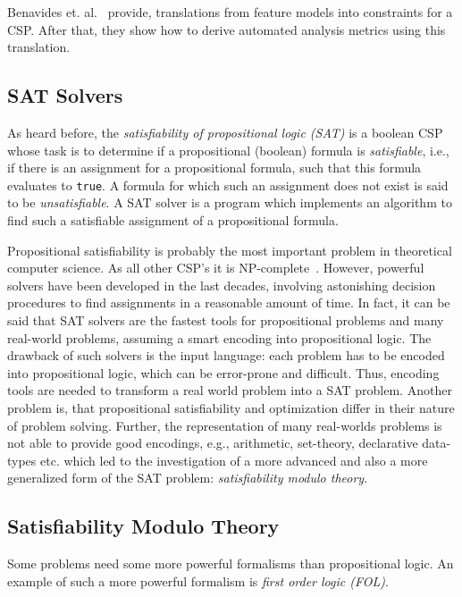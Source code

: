 Benavides et. al.~\cite{auto-reason-fm} provide, translations from feature models into constraints for a CSP. After that, they show how to derive automated analysis metrics using this translation.

\subsection{SAT Solvers}\label{subsec:sat}
As heard before, the \emph{satisfiability of propositional logic (SAT)} is a boolean CSP whose task is to determine if a propositional (boolean) formula is \emph{satisfiable}, i.e., if there is an assignment for a propositional formula, such that this formula evaluates to \verb|true|. A formula for which such an assignment does not exist is said to be \emph{unsatisfiable}. A SAT solver is a program which implements an algorithm to find such a satisfiable assignment of a propositional formula.

Propositional satisfiability is probably the most important problem in theoretical computer science. As all other CSP's it is NP-complete~\cite{cook}. 
However, powerful solvers have been developed in the last decades, involving astonishing decision procedures to find assignments in a reasonable amount of time. 
In fact, it can be said that SAT solvers are the fastest tools for propositional problems and many real-world problems, assuming a smart encoding into propositional logic.
The drawback of such solvers is the input language: each problem has to be encoded into propositional logic, which can be error-prone and difficult. Thus, encoding tools are needed to transform a real world problem into a SAT problem. Another problem is, that propositional satisfiability and optimization differ in their nature of problem solving. Further, the representation of many real-worlds problems is not able to provide good encodings, e.g., arithmetic, set-theory, declarative data-types etc. which led to the investigation of a more advanced and also a more generalized form of the SAT problem: \emph{satisfiability modulo theory}. 

\subsection{Satisfiability Modulo Theory}\label{subsec:smt}

Some problems need some more powerful formalisms than propositional logic.
An example of such a more powerful formalism is \emph{first order logic (FOL)}. 


